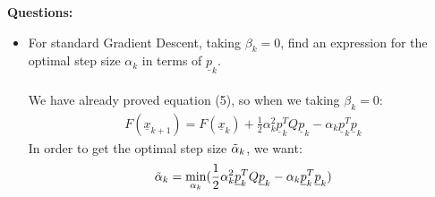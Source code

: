 \documentclass[11pt,letterpaper]{article}
\begin{document}
\begin{tcolorbox}
    \textbf{Questions:}
    \begin{itemize}
        \item For standard Gradient Descent, taking $\beta_k = 0$, find an expression for the optimal step size $\alpha_k$ in terms of $\underline p_k$.
        \\ \\     
        We have already proved equation (5), so when we taking $\beta_k = 0$:  
        \begin{align*}
            F(\underline x_{k+1}) = 
            F(\underline x_{k}) + \frac{1}{2} 
            \alpha_k^2 \underline p_k^T Q \underline p_k
            - \alpha_k \underline p_k^T \underline p_k
        \end{align*}
        In order to get the optimal step size $\Tilde{\alpha}_k$, we want:
        \begin{align*}
            \Tilde{\alpha}_k = \min_{\alpha_k}(\frac{1}{2} 
            \alpha_k^2 \underline p_k^T Q \underline p_k
            - \alpha_k \underline p_k^T \underline p_k)
        \end{align*}
    \end{itemize}
\end{tcolorbox}


\newpage
\end{document}
